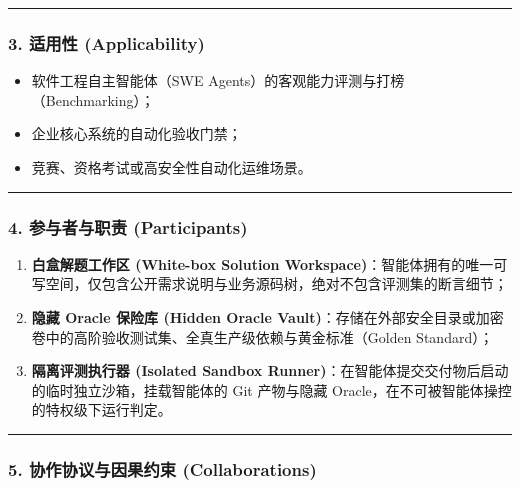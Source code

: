 \documentclass[
]{ctexart}
\providecommand{\tightlist}{%
  \setlength{\itemsep}{0pt}\setlength{\parskip}{0pt}}
\renewcommand{\_}{\discretionary{}{}{\textunderscore}}
\begin{document}
\begin{center}\rule{0.5\linewidth}{0.5pt}\end{center}

\subsubsection{3. 适用性
(Applicability)}\label{ux9002ux7528ux6027-applicability-17}

\begin{itemize}
\tightlist
\item
  软件工程自主智能体（SWE Agents）的客观能力评测与打榜（Benchmarking）；
\item
  企业核心系统的自动化验收门禁；
\item
  竞赛、资格考试或高安全性自动化运维场景。
\end{itemize}

\begin{center}\rule{0.5\linewidth}{0.5pt}\end{center}

\subsubsection{4. 参与者与职责
(Participants)}\label{ux53c2ux4e0eux8005ux4e0eux804cux8d23-participants-17}

\begin{enumerate}
\def\labelenumi{\arabic{enumi}.}
\tightlist
\item
  \textbf{白盒解题工作区 (White-box Solution
  Workspace)}：智能体拥有的唯一可写空间，仅包含公开需求说明与业务源码树，绝对不包含评测集的断言细节；
\item
  \textbf{隐藏 Oracle 保险库 (Hidden Oracle
  Vault)}：存储在外部安全目录或加密卷中的高阶验收测试集、全真生产级依赖与黄金标准（Golden
  Standard）；
\item
  \textbf{隔离评测执行器 (Isolated Sandbox
  Runner)}：在智能体提交交付物后启动的临时独立沙箱，挂载智能体的 Git
  产物与隐藏 Oracle，在不可被智能体操控的特权级下运行判定。
\end{enumerate}

\begin{center}\rule{0.5\linewidth}{0.5pt}\end{center}

\subsubsection{5. 协作协议与因果约束
(Collaborations)}\label{ux534fux4f5cux534fux8baeux4e0eux56e0ux679cux7ea6ux675f-collaborations-14}
\end{document}
